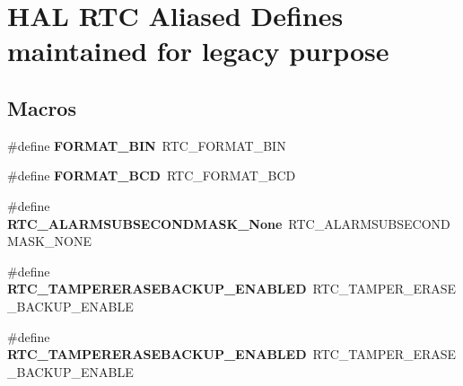\hypertarget{group___h_a_l___r_t_c___aliased___defines}{\section{H\-A\-L R\-T\-C Aliased Defines maintained for legacy purpose}
\label{group___h_a_l___r_t_c___aliased___defines}
}
\subsection*{Macros}
\begin{DoxyCompactItemize}
\item 
\hypertarget{group___h_a_l___r_t_c___aliased___defines_ga1adf0882a1368a3cef0edc34dcf8d34e}{\#define {\bfseries F\-O\-R\-M\-A\-T\-\_\-\-B\-I\-N}~R\-T\-C\-\_\-\-F\-O\-R\-M\-A\-T\-\_\-\-B\-I\-N}\label{group___h_a_l___r_t_c___aliased___defines_ga1adf0882a1368a3cef0edc34dcf8d34e}

\item 
\hypertarget{group___h_a_l___r_t_c___aliased___defines_ga950fc88b539cc9a8cf66aab2ee860fe1}{\#define {\bfseries F\-O\-R\-M\-A\-T\-\_\-\-B\-C\-D}~R\-T\-C\-\_\-\-F\-O\-R\-M\-A\-T\-\_\-\-B\-C\-D}\label{group___h_a_l___r_t_c___aliased___defines_ga950fc88b539cc9a8cf66aab2ee860fe1}

\item 
\hypertarget{group___h_a_l___r_t_c___aliased___defines_ga242adf20d2422fd1ae7715b8acd82623}{\#define {\bfseries R\-T\-C\-\_\-\-A\-L\-A\-R\-M\-S\-U\-B\-S\-E\-C\-O\-N\-D\-M\-A\-S\-K\-\_\-\-None}~R\-T\-C\-\_\-\-A\-L\-A\-R\-M\-S\-U\-B\-S\-E\-C\-O\-N\-D\-M\-A\-S\-K\-\_\-\-N\-O\-N\-E}\label{group___h_a_l___r_t_c___aliased___defines_ga242adf20d2422fd1ae7715b8acd82623}

\item 
\hypertarget{group___h_a_l___r_t_c___aliased___defines_ga4a78a492baabe7132ddfcf94cf7805c0}{\#define {\bfseries R\-T\-C\-\_\-\-T\-A\-M\-P\-E\-R\-E\-R\-A\-S\-E\-B\-A\-C\-K\-U\-P\-\_\-\-E\-N\-A\-B\-L\-E\-D}~R\-T\-C\-\_\-\-T\-A\-M\-P\-E\-R\-\_\-\-E\-R\-A\-S\-E\-\_\-\-B\-A\-C\-K\-U\-P\-\_\-\-E\-N\-A\-B\-L\-E}\label{group___h_a_l___r_t_c___aliased___defines_ga4a78a492baabe7132ddfcf94cf7805c0}

\item 
\hypertarget{group___h_a_l___r_t_c___aliased___defines_ga4a78a492baabe7132ddfcf94cf7805c0}{\#define {\bfseries R\-T\-C\-\_\-\-T\-A\-M\-P\-E\-R\-E\-R\-A\-S\-E\-B\-A\-C\-K\-U\-P\-\_\-\-E\-N\-A\-B\-L\-E\-D}~R\-T\-C\-\_\-\-T\-A\-M\-P\-E\-R\-\_\-\-E\-R\-A\-S\-E\-\_\-\-B\-A\-C\-K\-U\-P\-\_\-\-E\-N\-A\-B\-L\-E}\label{group___h_a_l___r_t_c___aliased___defines_ga4a78a492baabe7132ddfcf94cf7805c0}


\end{DoxyCompactItemize}
